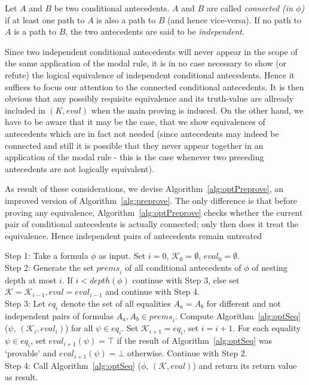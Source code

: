 \documentclass{entcs} \usepackage{entcsmacro}
\newcommand{\prems}{\mathit{prems}}
\newcommand{\eval}{\mathit{eval}}
\begin{document}
\begin{definition}
Let $A$ and $B$ be two conditional antecedents. $A$ and $B$ are called \emph{connected (in $\phi$)} if
at least one path to $A$ is also a path to $B$ (and hence vice-versa). If no path to $A$ is a path to $B$,
the two antecedents are said to be \emph{independent}.
\end{definition}

Since two independent conditional antecedents will never appear in the scope of the
same application of the modal rule, it is in no case necessary to show (or
refute) the logical equivalence of independent conditional antecedents. Hence it suffices to focus
our attention to the connected conditional antecedents. It is then obvious that
any possibly requisite equivalence and its truth-value are allready included in $(K,\eval)$
when the main proving is induced. On the other hand, we have to be aware that it
may be the case, that we show equivalences of antecedents which are in fact not needed
(since antecedents may indeed be connected and still it is possible that they never appear together in an application
of the modal rule - this is the case whenever two preceding antecedents are not logically equivalent).

As result of these considerations, we devise Algorithm~\ref{alg:optPreprove},
an improved version of Algorithm~\ref{alg:preprove}. The only difference is
that before proving any equivalence, Algorithm~\ref{alg:optPreprove} checks
whether the current pair of conditional antecedents is actually connected;
only then does it treat the equivalence. Hence independent pairs of antecedents
remain untreated
\begin{alg}
\begin{upshape}
  Step 1: Take a formula $\phi$ as input. Set $i=0$, $\mathcal{K}_0=\emptyset$, $\eval_0=\emptyset$.\\
  Step 2: Generate the set $\prems_i$ of all conditional antecedents of $\phi$
  of nesting depth at most $i$. If $i<depth(\phi)$ continue
  with Step 3, else set $\mathcal{K}=\mathcal{K}_{i-1}, \eval=\eval_{i-1}$ and continue with Step 4.\\
  Step 3: Let $eq_i$ denote the set of all equalities $A_a = A_b$ for different and not independent
  pairs of formulas $A_a,A_b\in \prems_i$. Compute
  Algorithm~\ref{alg:optSeq} ($\psi$, $(\mathcal{K}_i,\eval_i)$) for all $\psi\in eq_i$.
  Set $\mathcal{K}_{i+1} = eq_i$, set $i = i + 1$. For each equality $\psi\in eq_i$,
  set $\eval_{i+1}(\psi)=\top$ if the result of Algorithm~\ref{alg:optSeq} was `provable'
  and $\eval_{i+1}(\psi)=\bot$ otherwise. Continue with Step 2.\\
  Step 4: Call Algorithm~\ref{alg:optSeq} ($\phi$, $(\mathcal{K},\eval)$) and return its 
  return value as result.
\label{alg:optPreprove}
\end{upshape}
\end{alg}
\end{document}
